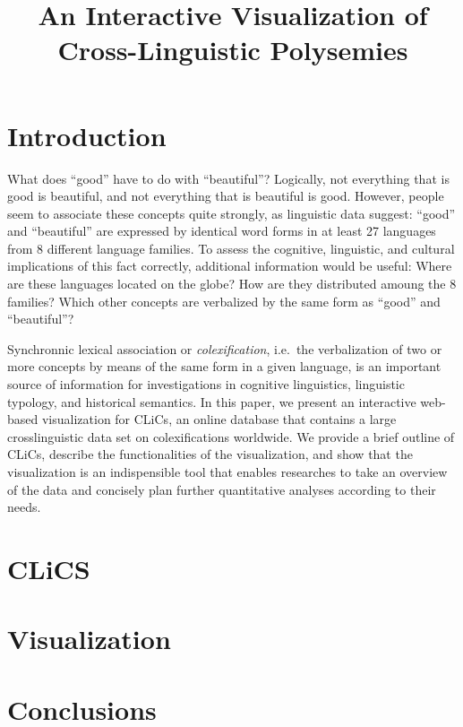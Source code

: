\documentclass[10pt, a4paper]{article}
\title{An Interactive Visualization of Cross-Linguistic Polysemies}
\begin{document}
\maketitleabstract

\section{Introduction}

What does ``good'' have to do with ``beautiful''? Logically, not everything that is good is beautiful, and not everything that is beautiful is good. However, people seem to associate these concepts quite strongly, as linguistic data suggest: ``good'' and ``beautiful'' are expressed by identical word forms in at least 27 languages from 8 different language families. To assess the cognitive, linguistic, and cultural implications of this fact correctly, additional information would be useful: Where are these languages located on the globe? How are they distributed amoung the 8 families? Which other concepts are verbalized by the same form as ``good'' and ``beautiful''?

Synchronnic lexical association or \textsl{colexification}, i.e.~the verbalization of two or more concepts by means of the same form in a given language, is an important source of information for investigations in cognitive linguistics, linguistic typology, and historical semantics. In this paper, we present an interactive web-based visualization for CLiCs, an online database that contains a large crosslinguistic data set on colexifications worldwide. We provide a brief outline of CLiCs, describe the functionalities of the visualization, and show that the visualization is an indispensible tool that enables researches to take an overview of the data and concisely plan further quantitative analyses according to their needs.

\section{CLiCS}



\section{Visualization}



\section{Conclusions}




\end{document}
